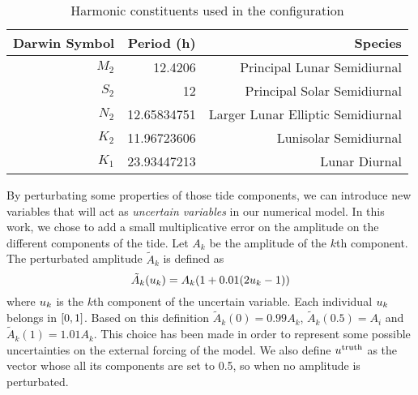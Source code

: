 \documentclass[../../Main_ManuscritThese.tex]{subfiles}
\begin{document}
\begin{table}[!h]
  \centering
  \begin{tabular}{rrr}\toprule
    Darwin Symbol & Period (h)   & Species                           \\ \midrule
    $M_2$         & 12.4206      & Principal Lunar Semidiurnal       \\
    $S_2$         & 12           & Principal Solar Semidiurnal       \\
    $N_2$         & 12.65834751  & Larger Lunar Elliptic Semidiurnal \\
    $K_2$         & 11.96723606  & Lunisolar Semidiurnal             \\
    $K_1$         & 23.93447213  & Lunar Diurnal                     \\
    \bottomrule
  \end{tabular}
  \caption{Harmonic constituents used in the configuration}
  \label{tab:tides_components}
\end{table}
By perturbating some properties of those tide components, we can
introduce new variables that will act as \emph{uncertain variables} in
our numerical model.  In this work, we chose to add a small
multiplicative error on the amplitude on the different components of
the tide. Let $A_k$ be the amplitude of the $k$th component. The
perturbated amplitude $\tilde{A}_k$ is defined as
\begin{equation}
  \label{eq:tide_error}
  \tilde{A}_k(u_k) = A_k (1 + 0.01(2u_k - 1))
\end{equation}
where $u_k$ is the $k$th component of the uncertain variable. Each
individual $u_k$ belongs in $\interval{0}{1}$. Based on this
definition $\tilde{A}_k(0) = 0.99A_k$, $\tilde{A}_k(0.5) = A_i$ and
$\tilde{A}_k(1) = 1.01A_k$. This choice has been made in order to
represent some possible uncertainties on the external forcing of the
model. We also define $u^{\mathrm{truth}}$ as the vector whose all
its components are set to \num{0.5}, so when no amplitude is
perturbated.
\end{document}
